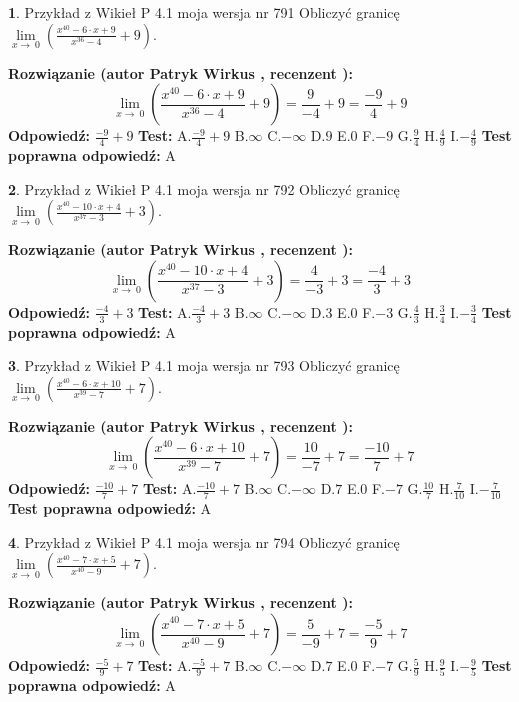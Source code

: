 \documentclass[12pt, a4paper]{article}
\theoremstyle{definition} %
\newtheorem{zad}{}
\newcommand{\zadStart}[1]{\begin{zad}#1\newline}
\newcommand{\zadStop}{\end{zad}}
\newcommand{\rozwStart}[2]{\noindent \textbf{Rozwiązanie (autor #1 , recenzent #2): }\newline}
\newcommand{\rozwStop}{\newline}
\newcommand{\odpStart}{\noindent \textbf{Odpowiedź:}\newline}
\newcommand{\odpStop}{\newline}
\newcommand{\testStart}{\noindent \textbf{Test:}\newline}
\newcommand{\testStop}{\newline}
\newcommand{\kluczStart}{\noindent \textbf{Test poprawna odpowiedź:}\newline}
\newcommand{\kluczStop}{\newline}
\begin{document}
\zadStart{Przykład z Wikieł P 4.1 moja wersja nr 791}
Obliczyć granicę $\lim\limits_{x\to\ 0}(\frac{x^{40}-6 \cdot x +9}{x^{36}-4}+9)$.
\zadStop
\rozwStart{Patryk Wirkus}{}
$$\lim\limits_{x\to\ 0}(\frac{x^{40}-6 \cdot x +9}{x^{36}-4}+9)=\frac{9}{-4}+9=\frac{-9}{4}+9$$
\rozwStop
\odpStart
$\frac{-9}{4}+9$
\odpStop
\testStart
A.$\frac{-9}{4}+9$
B.$\infty$
C.$-\infty$
D.$9$
E.$0$
F.$-9$
G.$\frac{9}{4}$
H.$\frac{4}{9}$
I.$-\frac{4}{9}$
\testStop
\kluczStart
A
\kluczStop



\zadStart{Przykład z Wikieł P 4.1 moja wersja nr 792}
Obliczyć granicę $\lim\limits_{x\to\ 0}(\frac{x^{40}-10 \cdot x +4}{x^{37}-3}+3)$.
\zadStop
\rozwStart{Patryk Wirkus}{}
$$\lim\limits_{x\to\ 0}(\frac{x^{40}-10 \cdot x +4}{x^{37}-3}+3)=\frac{4}{-3}+3=\frac{-4}{3}+3$$
\rozwStop
\odpStart
$\frac{-4}{3}+3$
\odpStop
\testStart
A.$\frac{-4}{3}+3$
B.$\infty$
C.$-\infty$
D.$3$
E.$0$
F.$-3$
G.$\frac{4}{3}$
H.$\frac{3}{4}$
I.$-\frac{3}{4}$
\testStop
\kluczStart
A
\kluczStop



\zadStart{Przykład z Wikieł P 4.1 moja wersja nr 793}
Obliczyć granicę $\lim\limits_{x\to\ 0}(\frac{x^{40}-6 \cdot x +10}{x^{39}-7}+7)$.
\zadStop
\rozwStart{Patryk Wirkus}{}
$$\lim\limits_{x\to\ 0}(\frac{x^{40}-6 \cdot x +10}{x^{39}-7}+7)=\frac{10}{-7}+7=\frac{-10}{7}+7$$
\rozwStop
\odpStart
$\frac{-10}{7}+7$
\odpStop
\testStart
A.$\frac{-10}{7}+7$
B.$\infty$
C.$-\infty$
D.$7$
E.$0$
F.$-7$
G.$\frac{10}{7}$
H.$\frac{7}{10}$
I.$-\frac{7}{10}$
\testStop
\kluczStart
A
\kluczStop



\zadStart{Przykład z Wikieł P 4.1 moja wersja nr 794}
Obliczyć granicę $\lim\limits_{x\to\ 0}(\frac{x^{40}-7 \cdot x +5}{x^{40}-9}+7)$.
\zadStop
\rozwStart{Patryk Wirkus}{}
$$\lim\limits_{x\to\ 0}(\frac{x^{40}-7 \cdot x +5}{x^{40}-9}+7)=\frac{5}{-9}+7=\frac{-5}{9}+7$$
\rozwStop
\odpStart
$\frac{-5}{9}+7$
\odpStop
\testStart
A.$\frac{-5}{9}+7$
B.$\infty$
C.$-\infty$
D.$7$
E.$0$
F.$-7$
G.$\frac{5}{9}$
H.$\frac{9}{5}$
I.$-\frac{9}{5}$
\testStop
\kluczStart
A
\kluczStop
\end{document}
